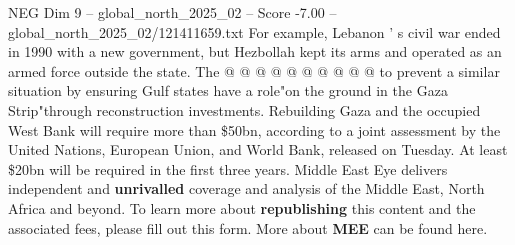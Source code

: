 \begin{textsample}{NEG Dim 9 – global\_north\_2025\_02 – Score -7.00 – global\_north\_2025\_02/121411659.txt}
For example, Lebanon ' s civil war ended in 1990 with a new government, but Hezbollah kept its arms and operated as an armed force outside the state.
The @ @ @ @ @ @ @ @ @ @ to prevent a similar situation by ensuring Gulf states have a role"on the ground in the Gaza Strip"through reconstruction investments.
Rebuilding Gaza and the occupied West Bank will require more than \$50bn, according to a joint assessment by the United Nations, European Union, and World Bank, released on Tuesday.
At least \$20bn will be required in the first three years.
Middle East Eye delivers independent and \textbf{unrivalled} coverage and analysis of the Middle East, North Africa and beyond.
To learn more about \textbf{republishing} this content and the associated fees, please fill out this form.
More about \textbf{MEE} can be found here.

\end{textsample}
